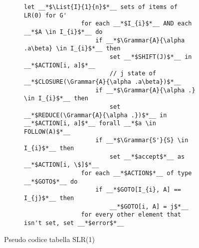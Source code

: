 \documentclass{subfiles}
\begin{document}
\begin{figure}[h!]
    \centering
    \begin{subfigure}[b]{0.625\textwidth}
        \begin{lstlisting}[language = PSEUDO]
                let __*$\List{I}{1}{n}$*__ sets of items of LR(0) for G'
                for each __*$I_{i}$*__ AND each __*$A \in I_{i}$*__ do
                    if __*$\Grammar{A}{\alpha .a\beta} \in I_{i}$*__ then 
                        set __*$SHIFT(J)$*__ in __*$ACTION[i, a]$*__
                        // j state of __*$CLOSURE(\Grammar{A}{\alpha .a\beta})$*__
                    if __*$\Grammar{A}{\alpha .} \in I_{i}$*__ then 
                        set __*$REDUCE(\Grammar{A}{\alpha .})$*__ in __*$ACTION[i, a]$*__ forall __*$a \in FOLLOW(A)$*__
                    if __*$\Grammar{S'}{S} \in I_{i}$*__ then
                        set __*$accept$*__ as __*$ACTION[i, \$]$*__
                for each __*$ACTION$*__ of type __*$GOTO$*__ do
                    if __*$GOTO[I_{i}, A] == I_{j}$*__ then
                        __*$GOTO[i, A] = j$*__
                for every other element that isn't set, set __*$error$*__
            \end{lstlisting}
    \end{subfigure}
    \caption{Pseudo codice tabella SLR(1)}
    \label{fig:9}
\end{figure}
\end{document}
